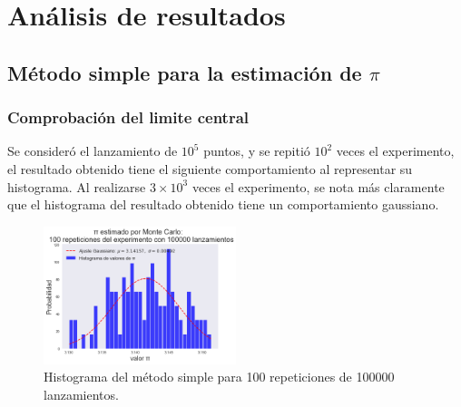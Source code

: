 \documentclass{rbf}
\begin{document}
\section{Análisis de resultados}
\subsection{Método simple para la estimación de $\pi$}
\subsubsection{Comprobación del limite central}
Se consideró el lanzamiento de $10^5$ puntos, y se repitió $10^2$ veces el experimento, el resultado obtenido tiene el siguiente comportamiento al representar su histograma. Al realizarse $3 \times 10^3$ veces el experimento, se nota más claramente que el histograma del resultado obtenido tiene un comportamiento gaussiano.

\begin{figure}[h]
 \centering
  \includegraphics[width=0.5\textwidth]{figures/100rep.png}
	\caption{Histograma del método simple para 100 repeticiones de 100000 lanzamientos.}
 \label{buff1}
\end{figure}
\end{document}
